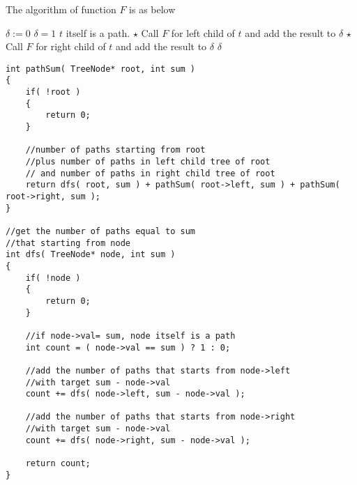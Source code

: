 The algorithm of function $F$ is as below
\setcounter{algorithm}{0}
\begin{algorithm}[H]
\caption{}
\begin{algorithmic}[1]
\State {}
\EndIf
\State $\delta:=0$
\State $\delta=1$ \Comment $t$ itself is a path.
\EndIf
\State $\star$ Call $F$ for left child of $t$ and add the result to $\delta$
\State $\star$ Call $F$ for right child of $t$ and add the result to $\delta$
\State \Return $\delta$
\EndFunction
\end{algorithmic}
\end{algorithm}

\begin{lstlisting}[style=customc, caption={DFS}]
int pathSum( TreeNode* root, int sum )
{
    if( !root )
    {
        return 0;
    }

    //number of paths starting from root
    //plus number of paths in left child tree of root
    // and number of paths in right child tree of root
    return dfs( root, sum ) + pathSum( root->left, sum ) + pathSum( root->right, sum );
}

//get the number of paths equal to sum
//that starting from node
int dfs( TreeNode* node, int sum )
{
    if( !node )
    {
        return 0;
    }

    //if node->val= sum, node itself is a path
    int count = ( node->val == sum ) ? 1 : 0;

    //add the number of paths that starts from node->left
    //with target sum - node->val
    count += dfs( node->left, sum - node->val );

    //add the number of paths that starts from node->right
    //with target sum - node->val
    count += dfs( node->right, sum - node->val );

    return count;
}
\end{lstlisting}